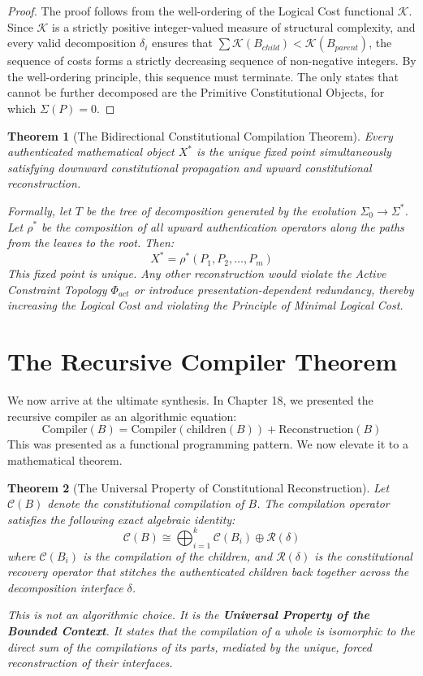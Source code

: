 \documentclass[12pt,openany]{extbook}
\theoremstyle{plain}
\newtheorem{theorem}{Theorem}[chapter]
\theoremstyle{definition}
\begin{document}
\begin{proof}
The proof follows from the well-ordering of the Logical Cost functional $\mathcal{K}$. Since $\mathcal{K}$ is a strictly positive integer-valued measure of structural complexity, and every valid decomposition $\delta_i$ ensures that $\sum \mathcal{K}(B_{child}) < \mathcal{K}(B_{parent})$, the sequence of costs forms a strictly decreasing sequence of non-negative integers. By the well-ordering principle, this sequence must terminate. The only states that cannot be further decomposed are the Primitive Constitutional Objects, for which $\Sigma(P) = 0$.
\end{proof}

\begin{theorem}[The Bidirectional Constitutional Compilation Theorem]
Every authenticated mathematical object $X^*$ is the unique fixed point simultaneously satisfying downward constitutional propagation and upward constitutional reconstruction.

Formally, let $T$ be the tree of decomposition generated by the evolution $\Sigma_0 \to \Sigma^*$. Let $\rho^*$ be the composition of all upward authentication operators along the paths from the leaves to the root. Then:
\[
X^* = \rho^*(P_1, P_2, \dots, P_m)
\]
This fixed point is unique. Any other reconstruction would violate the Active Constraint Topology $\Phi_{act}$ or introduce presentation-dependent redundancy, thereby increasing the Logical Cost and violating the Principle of Minimal Logical Cost.
\end{theorem}

\section{The Recursive Compiler Theorem}

We now arrive at the ultimate synthesis. In Chapter 18, we presented the recursive compiler as an algorithmic equation:
\[
\text{Compiler}(B) = \text{Compiler}(\text{children}(B)) + \text{Reconstruction}(B)
\]
This was presented as a functional programming pattern. We now elevate it to a mathematical theorem.

\begin{theorem}[The Universal Property of Constitutional Reconstruction]
Let $\mathcal{C}(B)$ denote the constitutional compilation of $B$. The compilation operator satisfies the following exact algebraic identity:
\[
\mathcal{C}(B) \cong \bigoplus_{i=1}^k \mathcal{C}(B_i) \oplus \mathcal{R}(\delta)
\]
where $\mathcal{C}(B_i)$ is the compilation of the children, and $\mathcal{R}(\delta)$ is the constitutional recovery operator that stitches the authenticated children back together across the decomposition interface $\delta$.

This is not an algorithmic choice. It is the \textbf{Universal Property of the Bounded Context}. It states that the compilation of a whole is isomorphic to the direct sum of the compilations of its parts, mediated by the unique, forced reconstruction of their interfaces.
\end{theorem}
\end{document}
